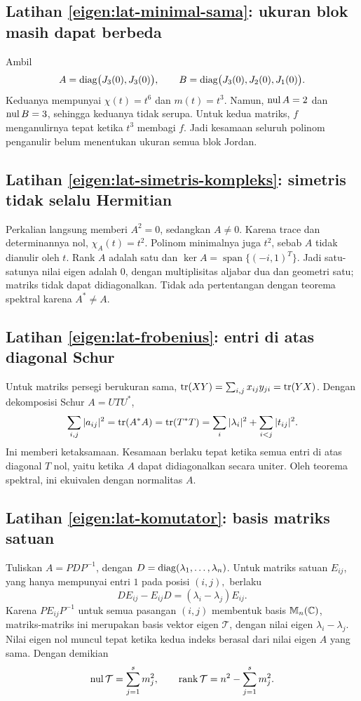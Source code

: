 \subsection*{Latihan \ref{eigen:lat-minimal-sama}: ukuran blok masih dapat berbeda}
Ambil
\[
    A=\operatorname{diag}\bigl(J_3(0),J_3(0)\bigr),\qquad
    B=\operatorname{diag}\bigl(J_3(0),J_2(0),J_1(0)\bigr).
\]
Keduanya mempunyai $\chi(t)=t^6$ dan $m(t)=t^3$.
Namun, $\operatorname{nul} A=2$ dan $\operatorname{nul} B=3$, sehingga keduanya tidak serupa.
Untuk kedua matriks, $f$ menganulirnya tepat ketika $t^3$ membagi $f$.
Jadi kesamaan seluruh polinom penganulir belum menentukan ukuran
semua blok Jordan.

\subsection*{Latihan \ref{eigen:lat-simetris-kompleks}: simetris tidak selalu Hermitian}
Perkalian langsung memberi $A^2=0$, sedangkan $A\ne0$.
Karena trace dan determinannya nol, $\chi_A(t)=t^2$.
Polinom minimalnya juga $t^2$, sebab $A$ tidak dianulir oleh $t$.
Rank $A$ adalah satu dan $\ker A=\operatorname{span}\{(-i,1)^T\}$.
Jadi satu-satunya nilai eigen adalah $0$, dengan multiplisitas
aljabar dua dan geometri satu; matriks tidak dapat didiagonalkan.
Tidak ada pertentangan dengan teorema spektral karena $A^*\ne A$.

\subsection*{Latihan \ref{eigen:lat-frobenius}: entri di atas diagonal Schur}
Untuk matriks persegi berukuran sama,
$\operatorname{tr}(XY)=\sum_{i,j}x_{ij}y_{ji}=\operatorname{tr}(YX)$.
Dengan dekomposisi Schur $A=UTU^*$,
\[
    \sum_{i,j}|a_{ij}|^2=\operatorname{tr}(A^*A)=\operatorname{tr}(T^*T)
    =\sum_i|\lambda_i|^2+\sum_{i<j}|t_{ij}|^2.
\]
Ini memberi ketaksamaan. Kesamaan berlaku tepat ketika semua entri
di atas diagonal $T$ nol, yaitu ketika $A$ dapat didiagonalkan
secara uniter. Oleh teorema spektral, ini ekuivalen dengan normalitas $A$.

\subsection*{Latihan \ref{eigen:lat-komutator}: basis matriks satuan}
Tuliskan $A=PDP^{-1}$, dengan $D=\operatorname{diag}(\lambda_1,\ldots,\lambda_n)$.
Untuk matriks satuan $E_{ij}$, yang hanya mempunyai entri $1$ pada
posisi $(i,j),$ berlaku
\[
    DE_{ij}-E_{ij}D=(\lambda_i-\lambda_j)E_{ij}.
\]
Karena $PE_{ij}P^{-1}$ untuk semua pasangan $(i,j)$ membentuk basis
$\mathbb{M}_n(\mathbb{C})$, matriks-matriks ini merupakan basis vektor eigen
$\mathcal T$, dengan nilai eigen $\lambda_i-\lambda_j$.
Nilai eigen nol muncul tepat ketika kedua indeks berasal dari
nilai eigen $A$ yang sama. Dengan demikian
\[
    \operatorname{nul}\mathcal T=\sum_{j=1}^s m_j^2,\qquad
    \operatorname{rank}\mathcal T=n^2-\sum_{j=1}^s m_j^2.
\]

